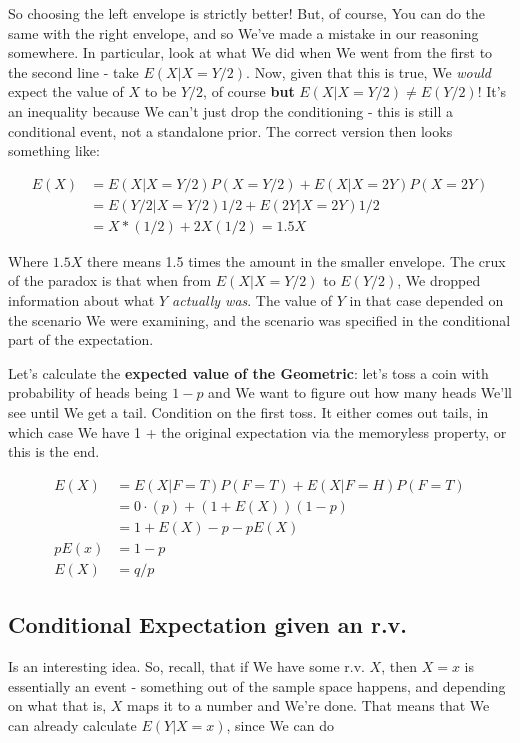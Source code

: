 \documentclass{article}
\begin{document}
		So choosing the left envelope is strictly better! But, of course, You can do the same with the right envelope, and so We've made a mistake in our reasoning somewhere. In particular, look at what We did when We went from the first to the second line - take $E(X|X=Y/2)$. Now, given that this is true, We \textit{would} expect the value of $X$ to be $Y/2$, of course \textbf{but} $E(X|X=Y/2)\neq E(Y/2)$! It's an inequality because We can't just drop the conditioning - this is still a conditional event, not a standalone prior. The correct version then looks something like:
		
		\begin{align*}
		E(X) &= E(X|X=Y/2)P(X=Y/2) + E(X|X=2Y)P(X=2Y)\\
		&= E(Y/2|X=Y/2)1/2 + E(2Y|X=2Y)1/2\\
		&= X*(1/2) + 2X(1/2) = 1.5X 
		\end{align*}
		
		Where $1.5X$ there means 1.5 times the amount in the smaller envelope. The crux of the paradox is that when from $E(X|X=Y/2)$ to $E(Y/2)$, We dropped information about what \textit{$Y$ actually was}. The value of $Y$ in that case depended on the scenario We were examining, and the scenario was specified in the conditional part of the expectation.

		Let's calculate the \textbf{expected value of the Geometric}: let's toss a coin with probability of heads being $1-p$ and We want to figure out how many heads We'll see until We get a tail. Condition on the first toss. It either comes out tails, in which case We have 1 + the original expectation via the memoryless property, or this is the end.
		
		\begin{align*}
		E(X) &= E(X|F=T)P(F=T) + E(X|F=H)P(F=T)\\
		&= 0\cdot (p) + (1+E(X))(1-p)\\
		&= 1+E(X) - p - pE(X)\\
		pE(x) &= 1-p\\
		E(X) &= q/p
		\end{align*}

	\subsection{Conditional Expectation given an r.v.}
	
		Is an interesting idea. So, recall, that if We have some r.v. $X$, then $X=x$ is essentially an event - something out of the sample space happens, and depending on what that is, $X$ maps it to a number and We're done. That means that We can already calculate $E(Y|X=x)$, since We can do
		
\end{document}
